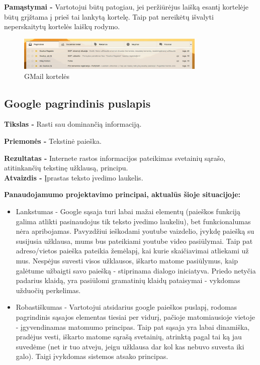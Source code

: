 ﻿\documentclass[a4paper, 12pt]{article}
\begin{document}
		\textbf{Pamąstymai -}
		Vartotojui būtų patogiau, jei peržiūrėjus laišką esantį kortelėje būtų grįžtama į prieš tai lankytą kortelę.
		Taip pat nereikėtų išvalyti neperskaitytų kortelės laiškų rodymo.

		\begin{figure}[h]
		\centering
		\includegraphics[width=0.8\textwidth]{images/korteles.png}
		\caption{GMail kortelės}
		\label{korteles}
		\end{figure}

	\subsection{Google pagrindinis puslapis}
		\textbf{Tikslas -}
		Rasti sau dominančią informaciją.

		\textbf{Priemonės -}
		Tekstinė paieška.
		
		\textbf{Rezultatas -}
		Internete rastos informacijos pateikimas svetainių sąrašo, atitinkančių tekstinę užklausą, principu.\\
		
		\textbf{Atvaizdis -}
		Įprastas teksto įvedimo laukelis.

		\textbf{Panaudojamumo projektavimo principai, aktualūs šioje situacijoje:}
		\begin{itemize}
		\item Lankstumas - Google sąsaja turi labai mažai elementų (paieškos funkciją galima atlikti pasinaudojus tik teksto įvedimo laukeliu), bet funkcionalumas nėra apribojamas.
		Pavyzdžiui ieškodami youtube vaizdelio, įvykdę paiešką su susijusia užklausa, mums bus pateikiami youtube video pasiūlymai.
		Taip pat adreso/vietos paieška pateikia žemėlapį, kai kurie skaičiavimai atliekami už mus.
		Nespėjus suvesti visos užklausos, iškarto matome pasiūlymus, kaip galėtume užbaigti savo paiešką - stiprinama dialogo iniciatyva.
		Priedo netyčia padarius klaidą, yra pasiūlomi gramatinių klaidų pataisymai - vykdomas užduočių perkelimas.
		\item Robastiškumas - Vartotojui atsidarius google paieškos puslapį, rodomas pagrindinis sąsajos elementas tiesiai per vidurį, pačioje matomiausioje vietoje - įgyvendinamas matomumo principas.
		Taip pat sąsaja yra labai dinamiška, pradėjus vesti, iškarto matome sąrašą svetainių, atrinktą pagal tai ką jau suvedėme (net ir tuo atveju, jeigu užklausa dar kol kas nebuvo suvesta iki galo).
		Taigi įvykdomas sistemos atsako principas.
		\end{itemize}
\end{document}
